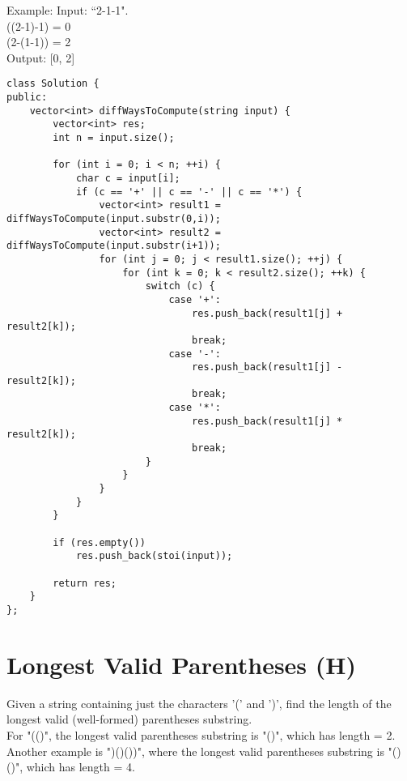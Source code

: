 Example: 
Input: ``2-1-1". \\
((2-1)-1) = 0\\
(2-(1-1)) = 2\\
Output: [0, 2]\\

\begin{lstlisting}
class Solution {
public:
    vector<int> diffWaysToCompute(string input) {
        vector<int> res;
        int n = input.size();
        
        for (int i = 0; i < n; ++i) {
            char c = input[i];
            if (c == '+' || c == '-' || c == '*') {
                vector<int> result1 = diffWaysToCompute(input.substr(0,i));
                vector<int> result2 = diffWaysToCompute(input.substr(i+1));
                for (int j = 0; j < result1.size(); ++j) {
                    for (int k = 0; k < result2.size(); ++k) {
                        switch (c) {
                            case '+':
                                res.push_back(result1[j] + result2[k]);
                                break;
                            case '-':
                                res.push_back(result1[j] - result2[k]);
                                break;
                            case '*':
                                res.push_back(result1[j] * result2[k]);
                                break;
                        }
                    }
                }
            }
        }
        
        if (res.empty())
            res.push_back(stoi(input));
            
        return res;
    }
};
\end{lstlisting}


\section{Longest Valid Parentheses (H)}
Given a string containing just the characters '(' and ')', find the length of the longest valid (well-formed) parentheses substring. \\

For "(()", the longest valid parentheses substring is "()", which has length = 2.\\

Another example is ")()())", where the longest valid parentheses substring is "()()", which has length = 4. \\

